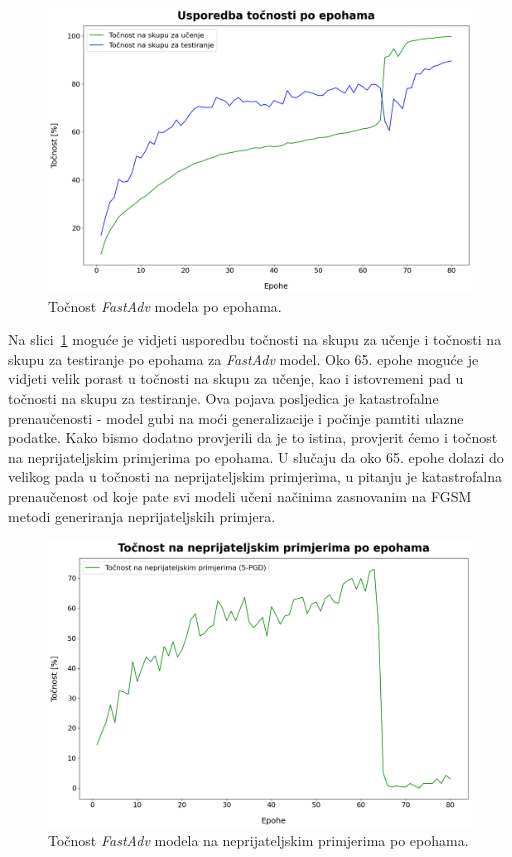 \documentclass[times, utf8, zavrsni, numeric]{fer}
\begin{document}
\begin{figure}[htb]
    \centering
    \includegraphics[scale=0.41]{../stats/resnet18_fast_epochs_80_lr_0.2_no_early/accuracies.png}
    \caption{Točnost \textit{FastAdv} modela po epohama.}
    \label{fig:fast_acc}
\end{figure}

Na slici~\ref{fig:fast_acc} moguće je vidjeti usporedbu točnosti na skupu za učenje i točnosti na skupu za testiranje po epohama za \textit{FastAdv} model.
Oko 65. epohe moguće je vidjeti velik porast u točnosti na skupu za učenje, kao i istovremeni pad u točnosti na skupu za testiranje.
Ova pojava posljedica je katastrofalne prenaučenosti - model gubi na moći generalizacije i počinje pamtiti ulazne podatke. 
Kako bismo dodatno provjerili da je to istina, provjerit ćemo i točnost na neprijateljskim primjerima po epohama. 
U slučaju da oko 65. epohe dolazi do velikog pada u točnosti na neprijateljskim primjerima, 
u pitanju je katastrofalna prenaučenost od koje pate svi modeli učeni načinima zasnovanim na FGSM metodi generiranja neprijateljskih primjera.

\begin{figure}[htb]
    \centering
    \includegraphics[scale=0.41]{../stats/resnet18_fast_epochs_80_lr_0.2_no_early/adv_accuracies.png}
    \caption{Točnost \textit{FastAdv} modela na neprijateljskim primjerima po epohama.}
    \label{fig:fast_adv_acc}
\end{figure}
\end{document}
